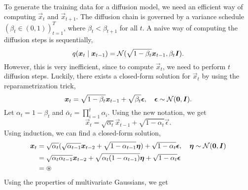 To generate the training data for a diffusion model, we need an efficient way of computing
$\vec{x}_t$ and $\vec{x}_{t+1}$. The diffusion chain is governed by a variance schedule $(\beta_t
    \in (0, 1))_{t=1}^T$, where $\beta_t < \beta_{t+1}$ for all $t$. A naive way of computing the diffusion steps is
sequentially, \[
    q(\bm{x}_t \mid \bm{x}_{t-1}) = \mathcal{N}(\sqrt{1 - \beta_t} \bm{x}_{t-1}, \beta_t \bm{I}).
\]
However, this is very inefficient, since to compute $\vec{x}_t$, we need to perform $t$ diffusion
steps. Luckily, there exists a closed-form solution for $\vec{x}_t$ by using the reparametrization
trick, \[
    \bm{x}_t = \sqrt{1 - \beta_t} \bm{x}_{t-1} + \sqrt{\beta_t} \bm{\epsilon}, \quad \bm{\epsilon} \sim \mathcal{N}(\bm{0}, \bm{I}).
\]
Let $\alpha_t = 1 - \beta_t$ and $\bar{\alpha}_t = \prod_{i=1}^t \alpha_i$. Using the new notation,
we get \[
    \vec{x}_t = \sqrt{\alpha_t} \vec{x}_{t-1} + \sqrt{1 - \alpha_t} \vec{\epsilon}.
\]
Using induction, we can find a closed-form solution,
\begin{align*}
    \bm{x}_t & = \sqrt{\alpha_t} (\sqrt{\alpha_{t-1}} \bm{x}_{t-2} + \sqrt{1-\alpha_{t-1}} \bm{\eta}) + \sqrt{1 - \alpha_t} \bm{\epsilon}, \quad \bm{\eta} \sim \mathcal{N}(\bm{0}, \bm{I}) \\
              & = \sqrt{\alpha_t \alpha_{t-1}} \bm{x}_{t-2} + \sqrt{\alpha_t (1-\alpha_{t-1})} \bm{\eta} + \sqrt{1 - \alpha_t} \bm{\epsilon}                                                    \\
              & = \circledast
\end{align*}
Using the properties of multivariate Gaussians, we get
